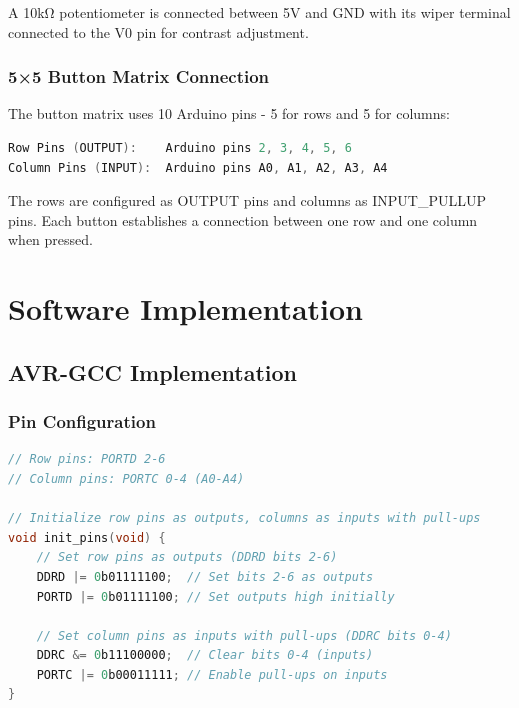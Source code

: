 \documentclass{article}
\begin{document}
A 10kΩ potentiometer is connected between 5V and GND with its wiper terminal connected to the V0 pin for contrast adjustment.

\subsubsection{5×5 Button Matrix Connection}
The button matrix uses 10 Arduino pins - 5 for rows and 5 for columns:

\begin{lstlisting}[language=C]
Row Pins (OUTPUT):    Arduino pins 2, 3, 4, 5, 6
Column Pins (INPUT):  Arduino pins A0, A1, A2, A3, A4
\end{lstlisting}

The rows are configured as OUTPUT pins and columns as INPUT\_PULLUP pins. Each button establishes a connection between one row and one column when pressed.

\section{Software Implementation}
\subsection{AVR-GCC Implementation}
\subsubsection{Pin Configuration}
\begin{lstlisting}[language=C]
// Row pins: PORTD 2-6
// Column pins: PORTC 0-4 (A0-A4)

// Initialize row pins as outputs, columns as inputs with pull-ups
void init_pins(void) {
    // Set row pins as outputs (DDRD bits 2-6)
    DDRD |= 0b01111100;  // Set bits 2-6 as outputs
    PORTD |= 0b01111100; // Set outputs high initially
    
    // Set column pins as inputs with pull-ups (DDRC bits 0-4)
    DDRC &= 0b11100000;  // Clear bits 0-4 (inputs)
    PORTC |= 0b00011111; // Enable pull-ups on inputs
}
\end{lstlisting}
\end{document}
